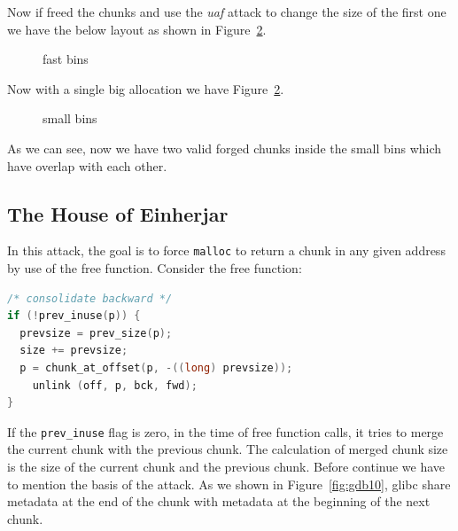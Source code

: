 \documentclass{masterthesis}
\newcommand*\libc{glibc}
\newcommand*\fb{fast bins}
\newcommand*\sbs{small bins}
\newcommand*\mallocc{\lstinline{malloc}\xspace}
\begin{document}
Now if freed the chunks and use the \emph{uaf} attack to change the size of the first one we have the below layout as shown in Figure~\ref{fig:gdb9}.

\begin{figure}[h!]
 \caption{\fb{}}
  \label{fig:gdb8}
\end{figure}

Now with a single big allocation we have Figure~\ref{fig:gdb9}.
\begin{figure}[h!]
 \caption{\sbs{}}
  \label{fig:gdb9}
\end{figure}

As we can see, now we have two valid forged chunks inside the \sbs{} which have overlap with each other.

\subsection{The House of Einherjar}
\label{subsect:houseein}
In this attack, the goal is to force \mallocc{} to return a chunk in any given address by use of the free function. Consider the free function:

\begin{lstlisting}[language=c,frame=tlrb]
/* consolidate backward */
if (!prev_inuse(p)) {
  prevsize = prev_size(p);
  size += prevsize;
  p = chunk_at_offset(p, -((long) prevsize));
	unlink (off, p, bck, fwd);
}
 \end{lstlisting}
If the \lstinline{prev_inuse} flag is zero, in the time of free function calls, it tries to merge the current chunk with the previous chunk. The calculation of merged chunk size is the size of the current chunk and the previous chunk. Before continue we have to mention the basis of the attack. As we shown in Figure~\ref{fig:gdb10}, \libc{} share metadata at the end of the chunk with metadata at the beginning of the next chunk.
\end{document}
